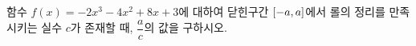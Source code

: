 함수 $f(x)=-2x^3-4x^2+8x+3$에 대하여 닫힌구간 $[-a{,}\mkern3mu\mathopen{}a]$에서 롤의 정리를 만족시키는 실수 $c$가 존재할 때, $\dfrac{a}{c}$의 값을 구하시오. 
